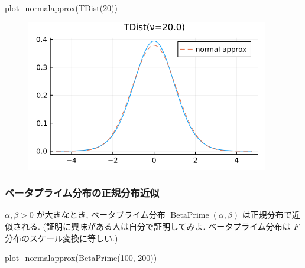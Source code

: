 \documentclass[
  letterpaper,
  DIV=11,
  numbers=noendperiod]{scrartcl}
\newenvironment{Shaded}{\begin{snugshade}}{\end{snugshade}}
\newcommand{\FloatTok}[1]{\textcolor[rgb]{0.68,0.00,0.00}{#1}}
\newcommand{\FunctionTok}[1]{\textcolor[rgb]{0.28,0.35,0.67}{#1}}
\newcommand{\NormalTok}[1]{\textcolor[rgb]{0.00,0.23,0.31}{#1}}
\begin{document}
\begin{Shaded}
\begin{Highlighting}[]
\FunctionTok{plot\_normalapprox}\NormalTok{(}\FunctionTok{TDist}\NormalTok{(}\FloatTok{20}\NormalTok{))}
\end{Highlighting}
\end{Shaded}

\begin{figure}[H]

{\centering \includegraphics{05 Central limit theorem_files/figure-pdf/cell-126-output-1.png}

}

\end{figure}

\hypertarget{ux30d9ux30fcux30bfux30d7ux30e9ux30a4ux30e0ux5206ux5e03ux306eux6b63ux898fux5206ux5e03ux8fd1ux4f3c}{%
\subsubsection{ベータプライム分布の正規分布近似}\label{ux30d9ux30fcux30bfux30d7ux30e9ux30a4ux30e0ux5206ux5e03ux306eux6b63ux898fux5206ux5e03ux8fd1ux4f3c}}

\(\alpha, \beta > 0\) が大きなとき, ベータプライム分布
\(\operatorname{BetaPrime}(\alpha, \beta)\) は正規分布で近似される.
(証明に興味がある人は自分で証明してみよ. ベータプライム分布は \(F\)
分布のスケール変換に等しい.)

\begin{Shaded}
\begin{Highlighting}[]
\FunctionTok{plot\_normalapprox}\NormalTok{(}\FunctionTok{BetaPrime}\NormalTok{(}\FloatTok{100}\NormalTok{, }\FloatTok{200}\NormalTok{))}
\end{Highlighting}
\end{Shaded}
\end{document}
